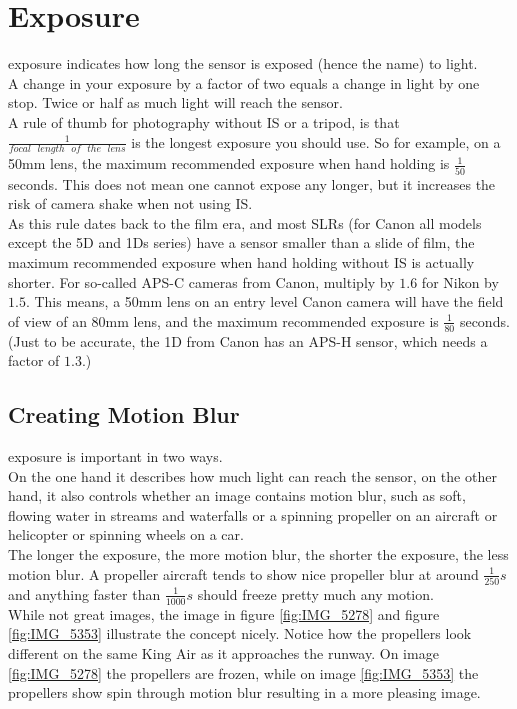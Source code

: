\section{Exposure}
\label{sec:Exposure}

\Gls{exposure} indicates how long the sensor is exposed (hence the name) to light.
\\
A change in your \gls{exposure} by a factor of two equals a change in light by one \gls{stop}. Twice or half as much light will reach the sensor.
\\
A rule of thumb for photography without \gls{IS} or a tripod, is that $\frac{1}{focal\mbox{ }length\mbox{ }of\mbox{ }the\mbox{ }lens}$ is the longest \gls{exposure} you should use. So for example, on a 50mm lens, the maximum recommended \gls{exposure} when hand holding is $\frac{1}{50}$ seconds. This does not mean one cannot expose any longer, but it increases the risk of camera shake when not using \gls{IS}.
\\
As this rule dates back to the film era, and most \glspl{SLR} (for Canon all models except the 5D and 1Ds series) have a \gls{sensor} smaller than a slide of film, the maximum recommended \gls{exposure} when hand holding without \gls{IS} is actually shorter. For so-called \gls{APS-C} cameras from Canon, multiply by $1.6$ for Nikon by $1.5$. This means, a 50mm lens on an entry level Canon camera will have the field of view of an 80mm lens, and the maximum recommended \gls{exposure} is $\frac{1}{80}$ seconds.
(Just to be accurate, the 1D from Canon has an \gls{APS-H} \gls{sensor}, which needs a factor of $1.3$.)


\subsection{Creating Motion Blur}

\Gls{exposure} is important in two ways.
\\
On the one hand it describes how much light can reach the \gls{sensor}, on the other hand, it also controls whether an image contains motion blur, such as soft, flowing water in streams and waterfalls or a spinning propeller on an aircraft or helicopter or spinning wheels on a car.
\\
The longer the \gls{exposure}, the more motion blur, the shorter the exposure, the less motion blur. A propeller aircraft tends to show nice propeller blur at around $\frac{1}{250}s$ and anything faster than $\frac{1}{1000}s$ should freeze pretty much any motion.
\\[\baselineskip]
While not great images, the image in figure \ref{fig:IMG_5278} and figure \ref{fig:IMG_5353} illustrate the concept nicely. Notice how the propellers look different on the same King Air as it approaches the runway. On image \ref{fig:IMG_5278} the propellers are frozen, while on image \ref{fig:IMG_5353} the propellers show spin through motion blur resulting in a more pleasing image.

